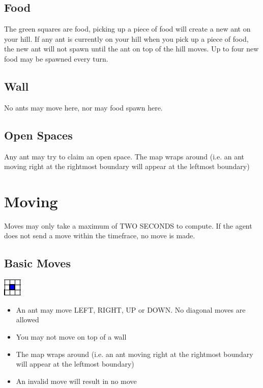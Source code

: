 \documentclass{article}
\begin{document}
\subsection{Food}
The green squares are food, picking up a piece of food will create a new ant on your hill. If any ant is currently on your hill when you pick up a piece of food, the new ant will not spawn until the ant on top of the hill moves. Up to four new food may be spawned every turn.

\subsection{Wall}
No ants may move here, nor may food spawn here.

\subsection{Open Spaces}
Any ant may try to claim an open space. The map wraps around (i.e. an ant moving right at the rightmost boundary will appear at the leftmost boundary)

\newpage
\section{Moving}
Moves may only take a maximum of TWO SECONDS to compute. If the agent does not send a move within the timefrace, no move is made.
\subsection{Basic Moves}
\begin{center}
\includegraphics{basicMove.png}
\end{center}
\begin{itemize}
  \item An ant may move LEFT, RIGHT, UP or DOWN. No diagonal moves are allowed
  \item You may not move on top of a wall
  \item The map wraps around (i.e. an ant moving right at the rightmost boundary will appear at the leftmost boundary)
  \item An invalid move will result in no move
\end{itemize}
\end{document}
